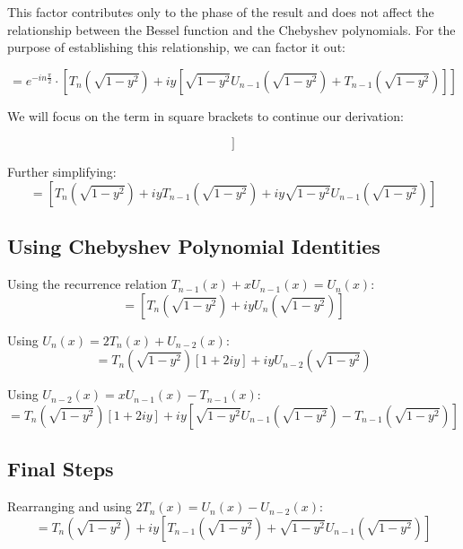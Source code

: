 \documentclass{article}
\begin{document}
This factor contributes only to the phase of the result and does not affect the relationship between the Bessel function and the Chebyshev polynomials. For the purpose of establishing this relationship, we can factor it out:

\begin{equation}
  = e^{-i n\frac{\pi}{2}} \cdot [T_n(\sqrt{1 - y^2}) + i y [\sqrt{1 - y^2} U_{n-1}(\sqrt{1 - y^2}) + T_{n-1}(\sqrt{1 - y^2})]]
\end{equation}

We will focus on the term in square brackets to continue our derivation:

\begin{equation}
  [T_n(\sqrt{1 - y^2}) + i y [\sqrt{1 - y^2} U_{n-1}(\sqrt{1 - y^2}) + T_{n-1}(\sqrt{1 - y^2})]]
\end{equation}

Further simplifying:
\begin{equation}
  = [T_n(\sqrt{1 - y^2}) + i y T_{n-1}(\sqrt{1 - y^2}) + i y \sqrt{1 - y^2} U_{n-1}(\sqrt{1 - y^2})]
\end{equation}

\subsection{Using Chebyshev Polynomial Identities}
Using the recurrence relation $T_{n-1}(x) + x U_{n-1}(x) = U_n(x)$:
\begin{equation}
  = [T_n(\sqrt{1 - y^2}) + i y U_n(\sqrt{1 - y^2})]
\end{equation}

Using $U_n(x) = 2T_n(x) + U_{n-2}(x)$:
\begin{equation}
  = T_n(\sqrt{1 - y^2}) [1 + 2iy] + i y U_{n-2}(\sqrt{1 - y^2})
\end{equation}

Using $U_{n-2}(x) = x U_{n-1}(x) - T_{n-1}(x)$:
\begin{equation}
  = T_n(\sqrt{1 - y^2}) [1 + 2iy] + i y [\sqrt{1 - y^2} U_{n-1}(\sqrt{1 - y^2}) - T_{n-1}(\sqrt{1 - y^2})]
\end{equation}

\subsection{Final Steps}
Rearranging and using $2T_n(x) = U_n(x) - U_{n-2}(x)$:
\begin{equation}
  = T_n(\sqrt{1 - y^2}) + i y [T_{n-1}(\sqrt{1 - y^2}) + \sqrt{1 - y^2} U_{n-1}(\sqrt{1 - y^2})]
\end{equation}
\end{document}
